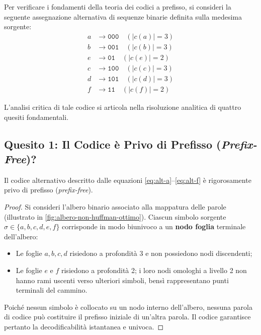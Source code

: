 Per verificare i fondamenti della teoria dei codici a prefisso, si consideri la seguente assegnazione alternativa di sequenze binarie definita sulla medesima sorgente:
\begin{align}
  a &\longrightarrow \texttt{000} \quad (|c(a)| = 3) \label{eq:alt-a} \\
  b &\longrightarrow \texttt{001} \quad (|c(b)| = 3) \label{eq:alt-b} \\
  e &\longrightarrow \texttt{01}  \quad (|c(e)| = 2) \label{eq:alt-e} \\
  c &\longrightarrow \texttt{100} \quad (|c(c)| = 3) \label{eq:alt-c} \\
  d &\longrightarrow \texttt{101} \quad (|c(d)| = 3) \label{eq:alt-d} \\
  f &\longrightarrow \texttt{11}  \quad (|c(f)| = 2) \label{eq:alt-f}
\end{align}

L'analisi critica di tale codice si articola nella risoluzione analitica di quattro quesiti fondamentali.

\FloatBarrier
\subsection{Quesito 1: Il Codice \`e Privo di Prefisso (\textit{Prefix-Free})?}
\label{subsec:quesito-1-prefix-free}

\begin{proposition}
Il codice alternativo descritto dalle equazioni \eqref{eq:alt-a}--\eqref{eq:alt-f} \`e rigorosamente privo di prefisso (\textit{prefix-free}).
\end{proposition}

\begin{proof}
Si consideri l'albero binario associato alla mappatura delle parole (illustrato in \autoref{fig:albero-non-huffman-ottimo}).
Ciascun simbolo sorgente $\sigma \in \{a, b, c, d, e, f\}$ corrisponde in modo biunivoco a un \textbf{nodo foglia} terminale dell'albero:
\begin{itemize}
  \item Le foglie $a, b, c, d$ risiedono a profondit\`a 3 e non possiedono nodi discendenti;
  \item Le foglie $e$ e $f$ risiedono a profondit\`a 2; i loro nodi omologhi a livello 2 non hanno rami uscenti verso ulteriori simboli, bens\`i rappresentano punti terminali del cammino.
\end{itemize}
Poich\'e nessun simbolo \`e collocato su un nodo interno dell'albero, nessuna parola di codice pu\`o costituire il prefisso iniziale di un'altra parola. Il codice garantisce pertanto la decodificabilit\`a istantanea e univoca.
\end{proof}

